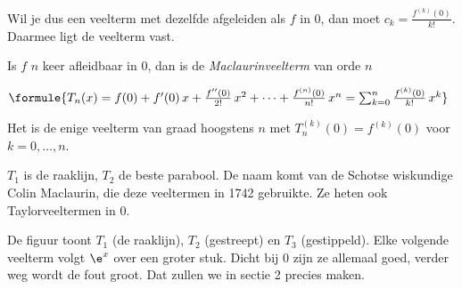 Wil je dus een veelterm met dezelfde afgeleiden als $f$ in 0, dan moet $c_k = \tfrac{f^{(k)}(0)}{k!}$. Daarmee ligt de veelterm vast.

\begin{theorie}
Is $f$ $n$ keer afleidbaar in 0, dan is de \emph{Maclaurinveelterm} van orde $n$

\vspace{1mm}
\qquad $\formule{T_n(x) = f(0) + f'(0)\,x + \frac{f''(0)}{2!}\,x^2 + \cdots + \frac{f^{(n)}(0)}{n!}\,x^n = \sum_{k=0}^{n} \frac{f^{(k)}(0)}{k!}\,x^k}$

\vspace{1mm}
Het is de enige veelterm van graad hoogstens $n$ met $T_n^{(k)}(0) = f^{(k)}(0)$ voor $k = 0, \ldots, n$.
\end{theorie}

$T_1$ is de raaklijn, $T_2$ de beste parabool. De naam komt van de Schotse wiskundige Colin Maclaurin, die deze veeltermen in 1742 gebruikte. Ze heten ook Taylorveeltermen in 0.


De figuur toont $T_1$ (de raaklijn), $T_2$ (gestreept) en $T_3$ (gestippeld). Elke volgende veelterm volgt $\e^x$ over een groter stuk. Dicht bij 0 zijn ze allemaal goed, verder weg wordt de fout groot. Dat zullen we in sectie 2 precies maken.

